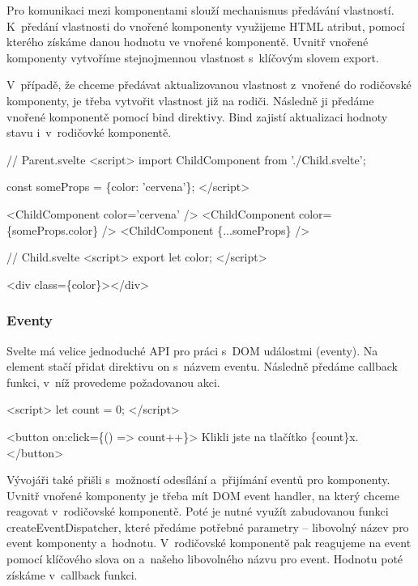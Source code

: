 Pro komunikaci mezi komponentami slouží mechanismus předávání vlastností. 
K~předání vlastnosti do vnořené komponenty využijeme HTML atribut, pomocí kterého získáme danou hodnotu ve vnořené komponentě.  
Uvnitř vnořené komponenty vytvoříme stejnojmennou vlastnost s~klíčovým slovem export.

V~případě, že chceme předávat aktualizovanou vlastnost z~vnořené do rodičovské komponenty, je třeba vytvořit vlastnost již na rodiči. 
Následně ji předáme vnořené komponentě pomocí bind direktivy. Bind zajistí aktualizaci hodnoty stavu i~v~rodičovké komponentě.\cite{svelte}

\begin{prog}
// Parent.svelte
<script>
  import ChildComponent from './Child.svelte';

  const someProps = \{color: 'cervena'\};
</script>

<ChildComponent color='cervena' />
<ChildComponent color=\{someProps.color\} />
<ChildComponent \{...someProps\} />

// Child.svelte
<script>
  export let color;
</script>

<div class=\{color\}></div>
\end{prog}

\subsubsection{Eventy} %

Svelte má velice jednoduché API pro práci s~DOM událostmi (eventy). Na element stačí přidat direktivu on s~názvem eventu. 
Následně předáme callback funkci, v~níž provedeme požadovanou akci.

\begin{prog}
<script>
  let count = 0;
</script>

<button on:click=\{() => count++\}>
  Klikli jste na tlačítko \{count\}x.
</button>
\end{prog}

Vývojáři také přišli s~možností odesílání a~přijímání eventů pro komponenty. 
Uvnitř vnořené komponenty je třeba mít DOM event handler, na který chceme reagovat v~rodičovské komponentě. 
Poté je nutné využít zabudovanou funkci createEventDispatcher, které předáme potřebné parametry -- libovolný název pro event komponenty a~hodnotu. 
V~rodičovské komponentě pak reagujeme na event pomocí klíčového slova on a~našeho libovolného názvu pro event. Hodnotu poté získáme v~callback funkci.\cite{sveltehandbook,svelte}

